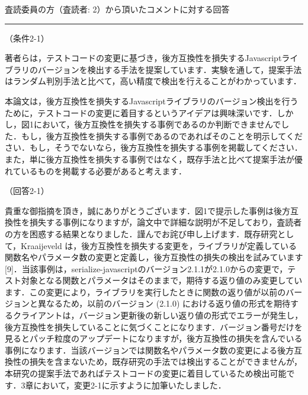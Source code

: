 \documentclass{jarticle} %
\def\section#1{ \vspace{3pc} {\large \gt #1} \vspace{1pc} \hrule }
\def\subsection#1{ \vspace{1pc} {\gt #1} }
\begin{document}
\newpage
\section{査読委員の方（査読者: 2）から頂いたコメントに対する回答}
\subsection{（条件2-1）}

著者らは，テストコードの変更に基づき，後方互換性を損失するJavascriptライブラリのバージョンを検出する手法を提案しています．実験を通して，提案手法はランダム判別手法と比べて，高い精度で検出を行えることがわかっています．

本論文は，後方互換性を損失するJavascriptライブラリのバージョン検出を行うために，テストコードの変更に着目するというアイデアは興味深いです．しかし，図1において，後方互換性を損失する事例であるのか判断できませんでした．もし，後方互換性を損失する事例であるのであればそのことを明示してください．もし，そうでないなら，後方互換性を損失する事例を掲載してください．また，単に後方互換性を損失する事例ではなく，既存手法と比べて提案手法が優れているものを掲載する必要があると考えます．


\subsection{（回答2-1）}

貴重な御指摘を頂き，誠にありがとうございます．図1で提示した事例は後方互換性を損失する事例になりますが，論文中で詳細な説明が不足しており，査読者の方を困惑する結果となりました．謹んでお詫び申し上げます．既存研究として，Kraaijeveld は，後方互換性を損失する変更を，ライブラリが定義している関数名やパラメータ数の変更と定義し，後方互換性の損失の検出を試みています [9]．当該事例は，serialize-javascriptのバージョン2.1.1が2.1.0からの変更で，テスト対象となる関数とパラメータはそのままで，期待する返り値のみ変更しています．この変更により，ライブラリを実行したときに関数の返り値が以前のバージョンと異なるため，以前のバージョン (2.1.0) における返り値の形式を期待するクライアントは，バージョン更新後の新しい返り値の形式でエラーが発生し，後方互換性を損失していることに気づくことになります．バージョン番号だけを見るとパッチ粒度のアップデートになりますが，後方互換性の損失を含んでいる事例になります．当該バージョンでは関数名やパラメータ数の変更による後方互換性の損失を含まないため，既存研究の手法では検出することができませんが，本研究の提案手法であればテストコードの変更に着目しているため検出可能です．3章において，変更2-1に示すように加筆いたしました．
\end{document}
